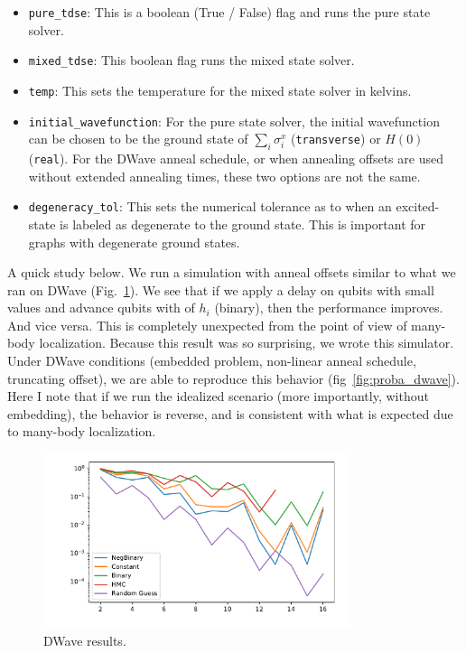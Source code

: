 \documentclass[]{article}
\begin{document}
\begin{itemize}
	\item \texttt{pure\_tdse}: This is a boolean (True / False) flag and runs the pure state solver.
	\item \texttt{mixed\_tdse}: This boolean flag runs the mixed state solver.
	\item \texttt{temp}: This sets the temperature for the mixed state solver in kelvins.
	\item \texttt{initial\_wavefunction}: For the pure state solver, the initial wavefunction can be chosen to be the ground state of $\sum_i \sigma_i^x$ (\texttt{transverse}) or $H(0)$ (\texttt{real}). For the DWave anneal schedule, or when annealing offsets are used without extended annealing times, these two options are not the same.
	\item \texttt{degeneracy\_tol}: This sets the numerical tolerance as to when an excited-state is labeled as degenerate to the ground state. This is important for graphs with degenerate ground states.
\end{itemize}

A quick study below. We run a simulation with anneal offsets similar to what we ran on DWave (Fig.~\ref{fig:dwave_result}). We see that if we apply a delay on qubits with small values and advance qubits with of $h_i$ (binary), then the performance improves. And vice versa. This is completely unexpected from the point of view of many-body localization. Because this result was so surprising, we wrote this simulator. Under DWave conditions (embedded problem, non-linear anneal schedule, truncating offset), we are able to reproduce this behavior (fig~\ref{fig:proba_dwave}). Here I note that if we run the idealized scenario (more importantly, without embedding), the behavior is reverse, and is consistent with what is expected due to many-body localization.

\begin{figure}[htb]
	\centering
	\includegraphics[width=0.8\textwidth]{scaling_full_0p10.pdf}
	\caption{\label{fig:dwave_result} DWave results.
	}
\end{figure}
\end{document}
